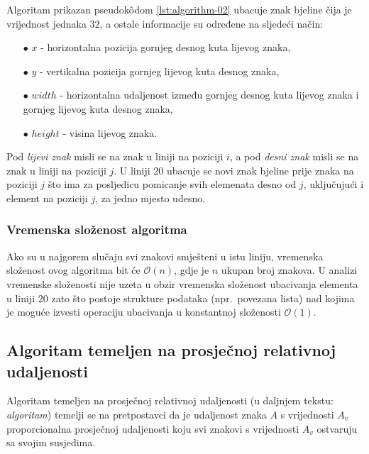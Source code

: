 \documentclass[times, utf8, zavrsni]{fer}
\begin{document}
\pagebreak

Algoritam prikazan pseudokôdom \ref{lst:algorithm-02} ubacuje znak bjeline
čija je vrijednost jednaka $32$, a ostale informacije su određene na sljedeći
način:
\begin{itemize}
    \item[$\bullet$] $x$ - horizontalna pozicija gornjeg desnog kuta lijevog
                           znaka,
    \item[$\bullet$] $y$ - vertikalna pozicija gornjeg lijevog kuta desnog
                           znaka,
    \item[$\bullet$] $width$ - horizontalna udaljenost između gornjeg desnog
                               kuta lijevog znaka i gornjeg lijevog kuta desnog
                               znaka,
    \item[$\bullet$] $height$ - visina lijevog znaka.
\end{itemize}

Pod \emph{lijevi znak} misli se na znak u liniji na poziciji $i$, a pod
\emph{desni znak} misli se na znak u liniji na poziciji $j$. U liniji $20$
ubacuje se novi znak bjeline prije znaka na poziciji $j$ što
ima za posljedicu pomicanje svih elemenata desno od $j$, uključujući i element
na poziciji $j$, za jedno mjesto udesno.


\subsubsection{Vremenska složenost algoritma}
Ako su u najgorem slučaju svi znakovi smješteni u istu liniju, vremenska
složenost ovog algoritma bit će $\mathcal{O}(n)$, gdje je $n$ ukupan broj
znakova. U analizi vremenske složenosti nije uzeta u obzir vremenska složenost
ubacivanja elementa u liniji $20$ zato što postoje
strukture podataka (npr.\ povezana lista) nad kojima je moguće izvesti operaciju
ubacivanja u konstantnoj složenosti $\mathcal{O}(1)$.

\pagebreak







\subsection{Algoritam temeljen na prosječnoj relativnoj udaljenosti}
\label{subsec:algoritam-temeljen-na-prosjecnoj-relativnoj-udaljenosti}
Algoritam temeljen na prosječnoj relativnoj udaljenosti (u daljnjem tekstu:
\emph{algoritam}) temelji se na pretpostavci da je udaljenost znaka $A$ s
vrijednosti  $A_v$ proporcionalna prosječnoj udaljenosti koju svi
znakovi s vrijednosti $A_v$ ostvaruju sa svojim susjedima.
\end{document}

